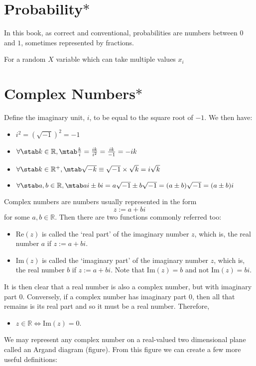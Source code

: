 \section{Probability$\ast$}
In this book, as correct and conventional, probabilities are numbers between $0$ and $1$, sometimes represented by fractions. 

For a random $X$ variable which can take multiple values $x_{i}$
\section{Complex Numbers$\ast$}
Define the imaginary unit, $i$, to be equal to the square root of $-1$. We then have:
\begin{itemize}
    \item $i^2= (\sqrt{-1})^2=-1$
    \item $\forall\stab k \in \mathbb{R}, \mtab \frac{k}{i}=\frac{ik}{i^2}=\frac{ik}{-1}=-ik$
    \item $\forall\stab k \in \mathbb{R}^+, \mtab \sqrt{-k}\equiv\sqrt{-1} \times \sqrt{k}=i\sqrt{k}$
    \item $\forall\stab a,b \in \mathbb{R}, \mtab ai \pm bi = a\sqrt{-1}\pm b\sqrt{-1}= (a\pm b)\sqrt{-1}=(a\pm b)i$
\end{itemize}
Complex numbers are numbers usually represented in the form 
$$
z:=a+bi
$$
for some $a,b\in\mathbb{R}$. Then there are two functions commonly referred too:
\begin{itemize}
\item $\text{Re}(z)$ is called the `real part' of the imaginary number $z$, which is, the real number $a$ if $z:=a+bi$.
\item $\text{Im}(z)$ is called the `imaginary part' of the imaginary number $z$, which is, the real number $b$ if $z:=a+bi$. Note that $\text{Im}(z)=b$ and not $\text{Im}(z)=bi$. 
\end{itemize}
It is then clear that a real number is also a complex number, but with imaginary part $0$. Conversely, if a complex number has imaginary part $0$, then all that remains is its real part and so it must be a real number. Therefore,
\begin{itemize}
    \item $z \in \mathbb{R} \iff \text{Im}(z)=0$.
\end{itemize}
We may represent any complex number on a real-valued two dimensional plane called an Argand diagram (figure). From this figure we can create a few more useful definitions:
